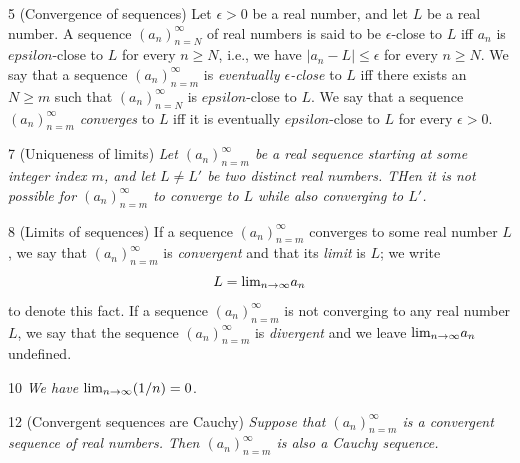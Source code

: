 \begin{definition}{5}
    \label{converges-to}
    (Convergence of sequences) Let $\epsilon > 0$ be a real number, and let $L$
    be a real number. A sequence $(a_n)_{n=N}^{\infty}$ of real numbers is said
    to be $\epsilon$-close to $L$ iff $a_n$ is $epsilon$-close to $L$ for every
    $n \geq N$, i.e., we have $|a_n - L| \leq \epsilon$ for every $n \geq N$.
    We say that a sequence $(a_n)_{n=m}^{\infty}$ is \emph{eventually $\epsilon$-close}
    to $L$ iff there exists an $N \geq m$ such that $(a_n)_{n=N}^{\infty}$
    is $epsilon$-close to $L$. We say that a sequence $(a_n)_{n=m}^{\infty}$
    \emph{converges} to $L$ iff it is eventually $epsilon$-close to $L$ for every
    $\epsilon > 0$.
\end{definition}

\begin{proposition}{7}
    \label{limit-unique}
    (Uniqueness of limits) \emph{Let $(a_n)_{n=m}^{\infty}$ be a real sequence
    starting at some integer index $m$, and let $L \neq L'$ be two distinct real
    numbers. THen it is not possible for $(a_n)_{n=m}^{\infty}$ to converge to $L$
    while also converging to $L'$.}
\end{proposition}

\begin{definition}{8}
    \label{limit}
    (Limits of sequences) If a sequence $(a_n)_{n=m}^{\infty}$ converges to some
    real number $L$, we say that $(a_n)_{n=m}^{\infty}$ is \emph{convergent} and
    that its \emph{limit} is $L$; we write
    \begin{equation*}
        L = \text{lim}_{n \rightarrow \infty}{a_n}
    \end{equation*}
    to denote this fact. If a sequence $(a_n)_{n=m}^{\infty}$ is not converging
    to any real number $L$, we say that the sequence $(a_n)_{n=m}^{\infty}$ is
    \emph{divergent} and we leave $\text{lim}_{n \rightarrow \infty}{a_n}$ undefined.
\end{definition}

\begin{proposition}{10}
    \label{lim-one-over-n}
    \emph{We have $\text{lim}_{n \rightarrow \infty}{(}1/n) = 0$}.
\end{proposition}

\begin{proposition}{12}
    \label{convergent-is-cauchy}
    (Convergent sequences are Cauchy) \emph{Suppose that $(a_n)_{n=m}^{\infty}$
    is a convergent sequence of real numbers. Then $(a_n)_{n=m}^{\infty}$ is also
    a Cauchy sequence.}
\end{proposition}

